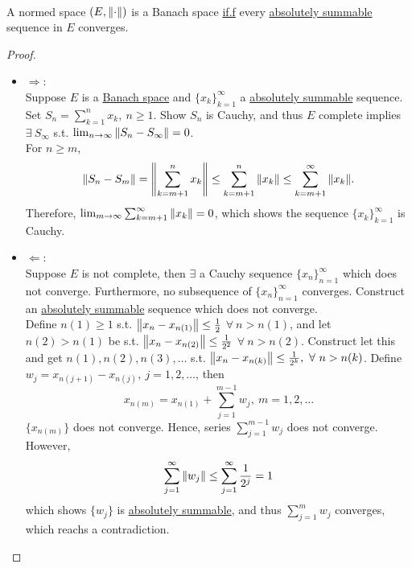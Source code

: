 \vspace{3pt}
\begin{theorem}\ \\
A normed space $(E, \norm{\cdot})$ is a Banach space \underline{if.f} every \underline{absolutely summable} sequence in $E$ converges.
\end{theorem}
\begin{proof}\
\begin{itemize}
    \item $\Rightarrow:$\ \\ 
    Suppose $E$ is a \underline{Banach space} and $\{x_k\}_{k=1}^\infty$ a \underline{absolutely summable} sequence. Set $S_n = \sum_{k = 1}^n x_k,\ n \geq 1$. Show $S_n$ is Cauchy, and thus $E$ complete implies $\exists\ S_\infty$ s.t. $\lim_{n \to \infty} \norm{S_n - S_\infty} = 0$.\\ For $n\geq m$, 
    \begin{equation*}
        \norm{S_n - S_m} = \norm{\sum_{k = m+1}^n x_k} \leq \sum_{k = m+1}^n \norm{x_k} \leq \sum_{k = m+1}^\infty \norm{x_k}.
    \end{equation*} 
    Therefore, $\lim_{m \to \infty} \sum_{k = m+1}^\infty \norm{x_k} = 0$, which shows the sequence $\{x_k\}_{k = 1}^\infty$ is Cauchy.
    \item $\Leftarrow:$\ \\ 
    Suppose $E$ is not complete, then $\exists$ a Cauchy sequence $\{x_n\}_{n=1}^\infty$ which does not converge. Furthermore, no subsequence of $\{x_n\}_{n=1}^\infty$ converges. Construct an \underline{absolutely summable} sequence which does not converge.\\
    Define $n(1) \geq 1$ s.t. $\norm{x_n - x_{n(1)}} \leq \frac{1}{2}$ $\forall\ n > n(1)$, and let $n(2) > n(1)$ be s.t. $\norm{x_n - x_{n(2)}} \leq \frac{1}{2^2}$ $\forall\ n > n(2)$. Construct let this and get $n(1), n(2), n(3),\dots$ s.t. $\norm{x_n - x_{n(k)}} \leq \frac{1}{2^k},\ \forall\ n > n(k)$. Define $w_j = x_{n(j+1)} - x_{n(j)},\ j = 1,2,\dots$, then
    $$x_{n(m)} = x_{n(1)} + \sum_{j = 1}^{m-1} w_j,\ m = 1,2,\dots$$
    $\{x_{n(m)}\}$ does not converge. Hence, series $\sum_{j = 1}^{m-1} w_j$ does not converge. However,
    $$\sum_{j = 1}^\infty \norm{w_j} \leq \sum_{j = 1}^\infty \frac{1}{2^j} = 1$$
    which shows $\{w_j\}$ is \underline{absolutely summable}, and thus $\sum_{j = 1}^m w_j$ converges, which reachs a contradiction.
\end{itemize} 
\end{proof}

